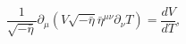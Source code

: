 \begin{equation}\label{taeq1}
\frac{1}{\sqrt{-\bar{\eta}}}\partial_{\mu}\left(V\sqrt{-\bar{\eta}}
\bar{\eta}^{\mu\nu}\partial_{\nu}T\right)=\frac{dV}{dT},
\end{equation}

